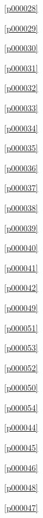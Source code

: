 \noindent\figurename\ \ref{p000028}\dotfill\pageref{p000028}

\noindent\figurename\ \ref{p000029}\dotfill\pageref{p000029}

\noindent\figurename\ \ref{p000030}\dotfill\pageref{p000030}

\noindent\figurename\ \ref{p000031}\dotfill\pageref{p000031}

\noindent\figurename\ \ref{p000032}\dotfill\pageref{p000032}

\noindent\figurename\ \ref{p000033}\dotfill\pageref{p000033}

\noindent\figurename\ \ref{p000034}\dotfill\pageref{p000034}

\noindent\figurename\ \ref{p000035}\dotfill\pageref{p000035}

\noindent\figurename\ \ref{p000036}\dotfill\pageref{p000036}

\noindent\figurename\ \ref{p000037}\dotfill\pageref{p000037}

\noindent\figurename\ \ref{p000038}\dotfill\pageref{p000038}

\noindent\figurename\ \ref{p000039}\dotfill\pageref{p000039}

\noindent\figurename\ \ref{p000040}\dotfill\pageref{p000040}

\noindent\figurename\ \ref{p000041}\dotfill\pageref{p000041}

\noindent\figurename\ \ref{p000042}\dotfill\pageref{p000042}

\noindent\figurename\ \ref{p000049}\dotfill\pageref{p000049}

\noindent\figurename\ \ref{p000051}\dotfill\pageref{p000051}

\noindent\figurename\ \ref{p000053}\dotfill\pageref{p000053}

\noindent\figurename\ \ref{p000052}\dotfill\pageref{p000052}

\noindent\figurename\ \ref{p000050}\dotfill\pageref{p000050}

\noindent\figurename\ \ref{p000054}\dotfill\pageref{p000054}

\noindent\figurename\ \ref{p000044}\dotfill\pageref{p000044}

\noindent\figurename\ \ref{p000045}\dotfill\pageref{p000045}

\noindent\figurename\ \ref{p000046}\dotfill\pageref{p000046}

\noindent\figurename\ \ref{p000048}\dotfill\pageref{p000048}

\noindent\figurename\ \ref{p000047}\dotfill\pageref{p000047}










